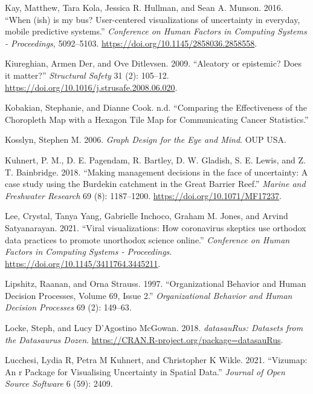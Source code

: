\documentclass[
  letterpaper,
  DIV=11,
  numbers=noendperiod]{scrartcl}
\newlength{\cslhangindent}
\newlength{\cslentryspacingunit} %
\newenvironment{CSLReferences}[2] %
 {%
  \setlength{\parindent}{0pt}
  \ifodd #1
  \let\oldpar\par
  \def\par{\hangindent=\cslhangindent\oldpar}
  \fi
  \setlength{\parskip}{#2\cslentryspacingunit}
 }%
 {}
\begin{document}
\begin{CSLReferences}{1}{0}
\leavevmode{}%
Kay, Matthew, Tara Kola, Jessica R. Hullman, and Sean A. Munson. 2016.
{``{When (ish) is my bus? User-centered visualizations of uncertainty in
everyday, mobile predictive systems}.''} \emph{Conference on Human
Factors in Computing Systems - Proceedings}, 5092--5103.
\url{https://doi.org/10.1145/2858036.2858558}.

\leavevmode{}%
Kiureghian, Armen Der, and Ove Ditlevsen. 2009. {``{Aleatory or
epistemic? Does it matter?}''} \emph{Structural Safety} 31 (2): 105--12.
\url{https://doi.org/10.1016/j.strusafe.2008.06.020}.

\leavevmode{}%
Kobakian, Stephanie, and Dianne Cook. n.d. {``{Comparing the
Effectiveness of the Choropleth Map with a Hexagon Tile Map for
Communicating Cancer Statistics}.''}

\leavevmode{}%
Kosslyn, Stephen M. 2006. \emph{Graph Design for the Eye and Mind}. OUP
USA.

\leavevmode{}%
Kuhnert, P. M., D. E. Pagendam, R. Bartley, D. W. Gladish, S. E. Lewis,
and Z. T. Bainbridge. 2018. {``{Making management decisions in the face
of uncertainty: A case study using the Burdekin catchment in the Great
Barrier Reef}.''} \emph{Marine and Freshwater Research} 69 (8):
1187--1200. \url{https://doi.org/10.1071/MF17237}.

\leavevmode{}%
Lee, Crystal, Tanya Yang, Gabrielle Inchoco, Graham M. Jones, and Arvind
Satyanarayan. 2021. {``{Viral visualizations: How coronavirus skeptics
use orthodox data practices to promote unorthodox science online}.''}
\emph{Conference on Human Factors in Computing Systems - Proceedings}.
\url{https://doi.org/10.1145/3411764.3445211}.

\leavevmode{}%
Lipshitz, Raanan, and Orna Strauss. 1997. {``{Organizational Behavior
and Human Decision Processes, Volume 69, Issue 2}.''}
\emph{Organizational Behavior and Human Decision Processes} 69 (2):
149--63.

\leavevmode{}%
Locke, Steph, and Lucy D'Agostino McGowan. 2018. \emph{datasauRus:
Datasets from the Datasaurus Dozen}.
\url{https://CRAN.R-project.org/package=datasauRus}.

\leavevmode{}%
Lucchesi, Lydia R, Petra M Kuhnert, and Christopher K Wikle. 2021.
{``Vizumap: An r Package for Visualising Uncertainty in Spatial Data.''}
\emph{Journal of Open Source Software} 6 (59): 2409.


\end{CSLReferences}
\end{document}
